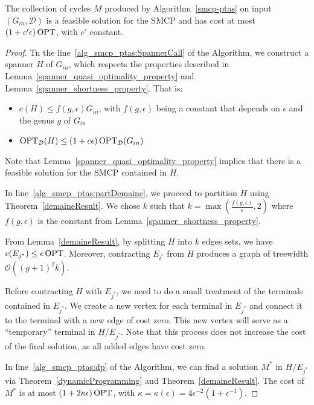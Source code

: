 \begin{theorem}
    The collection of cycles \(M\) produced by Algorithm~\ref{smcp-ptas} on input $(G_{in}, \mathcal{D})$ is a feasible solution for the SMCP and has cost at most \((1 + c' \epsilon) \operatorname{\textrm{OPT}}\), with \(c'\) constant.
\end{theorem}
\begin{proof}

    Tn the line~\ref{alg_smcp_ptas:SpannerCall} of the Algorithm, we construct a spanner \(H\) of \(G_{in}\), which respects the properties described in Lemma~\ref{spanner_quasi_optimality_property} and Lemma~\ref{spanner_shortness_property}. That is:

    \begin{itemize}
        \item \(c(H) \leq f(g, \epsilon) G_{in}\), with \(f(g, \epsilon)\) being a constant that depends on \(\epsilon\) and the genus \(g\) of \(G_{in}\)
        \item \(\operatorname{\textrm{OPT}}_{\mathcal{D}}(H) \leq (1 + c \epsilon) \operatorname{\textrm{OPT}}_{\mathcal{D}} (G_{in})\)
    \end{itemize}

    Note that Lemma~\ref{spanner_quasi_optimality_property} implies that there is a feasible solution for the SMCP contained in \(H\).

    In line~\ref{alg_smcp_ptas:partDemaine}, we proceed to partition \(H\) using Theorem~\ref{demaineResult}. We chose \(k\) such that \(k = \max( \frac{f(g, \epsilon)}{\epsilon}, 2)\) where \(f(g, \epsilon)\) is the constant from Lemma~\ref{spanner_shortness_property}. 
    
    From Lemma~\ref{demaineResult}, by splitting \(H\) into \(k\) edges sets, we have \(c(E_{j^\ast}) \leq \epsilon \operatorname{\textrm{OPT}}\). Moreover, contracting \(E_{i^\ast}\) from \(H\) produces a graph of treewidth \(\mathcal{O}((g +1)^2 k)\).

    Before contracting \(H\) with \(E_{j^\ast}\), we need to do a small treatment of the terminals contained in \(E_{j^\ast}\). We create a new vertex for each terminal in \(E_{j^\ast}\) and connect it to the terminal with a new edge of cost zero. This new vertex will serve as a ``temporary'' terminal in \(H / E_{j^\ast}\). Note that this process does not increase the cost of the final solution, as all added edges have cost zero.
    
    In line~\ref{alg_smcp_ptas:dp} of the Algorithm, we can find a solution \(M^\ast\) in \(H / E_{j^\ast}\) via Theorem~\ref{dynamicProgramming} and Theorem~\ref{demaineResult}. The cost of \(M^\ast\) is at most \((1 + 2 \kappa \epsilon) \operatorname{\textrm{OPT}}\), with \(\kappa = \kappa(\epsilon) = 4 \epsilon ^ {-2} (1 + \epsilon ^ {-1})\).


\end{proof}
